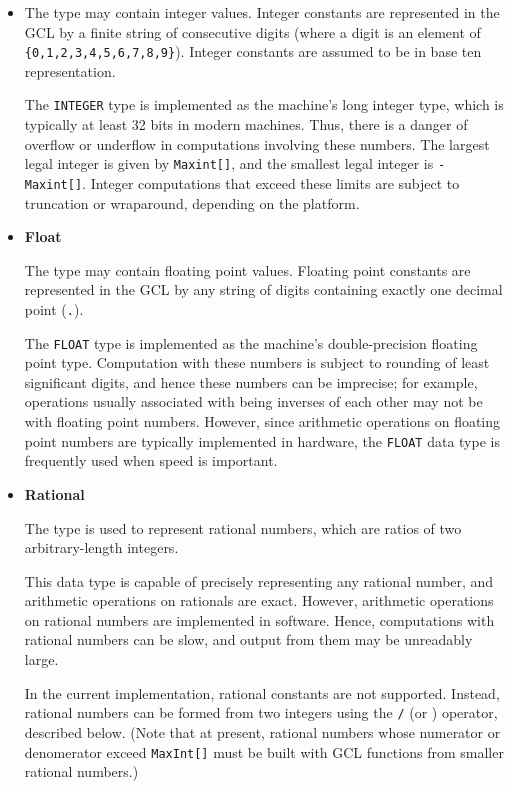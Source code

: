 \begin{itemize}
\item {}

The  type may contain integer values.  Integer constants
are represented in the GCL by a finite string of consecutive digits
(where a digit is an element of \verb+{0,1,2,3,4,5,6,7,8,9}+). Integer
constants are assumed to be in base ten representation.  

The \verb+INTEGER+ type is implemented as the machine's long integer
type, which is typically at least 32 bits in modern machines.  Thus,
there is a danger of overflow or underflow in computations involving
these numbers.  The largest legal integer is given by
\verb+Maxint[]+, and the smallest legal integer is
\verb+-Maxint[]+.  Integer computations that exceed these limits are
subject to truncation or wraparound, depending on the platform.

\item {\bf Float}

The  type may contain floating point values.  Floating
point constants are represented in the GCL by any string of digits
containing exactly one decimal point (\verb+.+).

The \verb+FLOAT+ type is implemented as the machine's double-precision
floating point type.  Computation with these numbers is subject to
rounding of least significant digits, and hence these numbers can be
imprecise; for example, operations usually associated with being
inverses of each other may not be with floating point
numbers. However, since arithmetic operations on floating point
numbers are typically implemented in hardware, the \verb+FLOAT+ data
type is frequently used when speed is important.

\item {\bf Rational}

The  type is used to represent rational numbers, which
are ratios of two arbitrary-length integers.   

This data type is capable of precisely representing any rational
number, and arithmetic operations on rationals are exact.  However,
arithmetic operations on rational numbers are implemented in software.
Hence, computations with rational numbers can be slow, and output from
them may be unreadably large.

In the current implementation, rational constants are not supported.
Instead, rational numbers can be formed from two integers using the
{\tt /} (or ) operator, described below.  (Note that at
present, rational numbers whose numerator or denomerator exceed
\verb+MaxInt[]+ must be built with GCL functions from smaller rational
numbers.)
\end{itemize}

